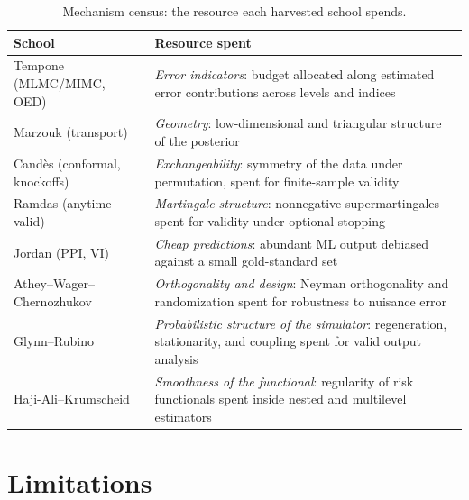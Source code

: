 \documentclass[11pt,a4paper]{article}
\begin{document}
\begin{table}[t]
\centering\small
\caption{Mechanism census: the resource each harvested school spends.}
\label{tab:census}
\begin{tabular}{@{}L{4.6cm}L{9.6cm}@{}}
\toprule
School & Resource spent \\
\midrule
Tempone (MLMC/MIMC, OED) & \emph{Error indicators}: budget allocated along
estimated error contributions across levels and indices \\
Marzouk (transport) & \emph{Geometry}: low-dimensional and triangular
structure of the posterior \\
Cand\`es (conformal, knockoffs) & \emph{Exchangeability}: symmetry of the
data under permutation, spent for finite-sample validity \\
Ramdas (anytime-valid) & \emph{Martingale structure}: nonnegative
supermartingales spent for validity under optional stopping \\
Jordan (PPI, VI) & \emph{Cheap predictions}: abundant ML output debiased
against a small gold-standard set \\
Athey--Wager--Chernozhukov & \emph{Orthogonality and design}: Neyman
orthogonality and randomization spent for robustness to nuisance error \\
Glynn--Rubino & \emph{Probabilistic structure of the simulator}:
regeneration, stationarity, and coupling spent for valid output analysis \\
Haji-Ali--Krumscheid & \emph{Smoothness of the functional}: regularity of
risk functionals spent inside nested and multilevel estimators \\
\bottomrule
\end{tabular}
\end{table}

\section{Limitations}\label{sec:limitations}
\end{document}
